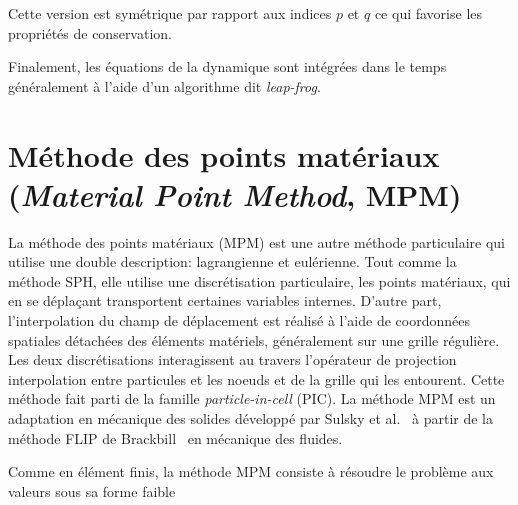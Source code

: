 Cette version est symétrique par rapport aux indices $p$ et $q$ ce qui favorise les propriétés de conservation.

Finalement, les équations de la dynamique sont intégrées dans le temps généralement à l'aide d'un algorithme dit \textit{leap-frog}.

\section{Méthode des points matériaux (\textit{Material Point Method}, MPM)}

La méthode des points matériaux (MPM) est une autre méthode particulaire qui utilise une double description: lagrangienne et eulérienne. Tout comme la méthode SPH, elle utilise une discrétisation particulaire, les points matériaux, qui en se déplaçant transportent certaines variables internes. D'autre part, l'interpolation du champ de déplacement est réalisé à l'aide de coordonnées spatiales détachées des éléments matériels, généralement sur une grille régulière. Les deux discrétisations interagissent au travers l'opérateur de projection interpolation entre particules et les noeuds et de la grille qui les entourent. Cette méthode fait parti de la famille \textit{particle-in-cell} (PIC). La méthode MPM est un adaptation en mécanique des solides développé par Sulsky et al.~\cite{sulsky_particle_1994} à partir de la méthode FLIP de Brackbill~\cite{brackbill_flip_1988} en mécanique des fluides.

Comme en élément finis, la méthode MPM consiste à résoudre le problème aux valeurs sous sa forme faible

